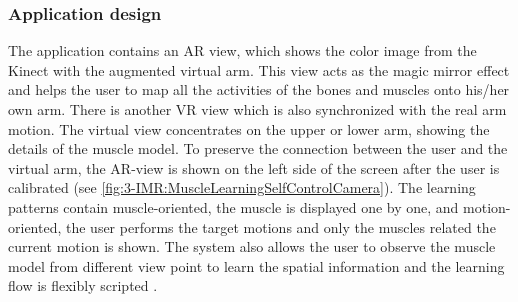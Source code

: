 \subsubsection{Application design}
The application contains an AR view, which shows the color image from the Kinect with the augmented virtual arm. This view acts as the magic mirror effect and helps the user to map all the activities of the bones and muscles onto his/her own arm. There is another VR view which is also synchronized with the real arm motion. The virtual view concentrates on the upper or lower arm, showing the details of the muscle model. To preserve the connection between the user and the virtual arm, the AR-view is shown on the left side of the screen after the user is calibrated (see \figurename{\ref{fig:3-IMR:MuscleLearningSelfControlCamera}}). 
The learning patterns contain muscle-oriented, the muscle is displayed one by one, and motion-oriented, the user performs the target motions and only the muscles related the current motion is shown. 
The system also allows the user to observe the muscle model from different view point to learn the spatial information and the learning flow is flexibly scripted \cite{Jutzi2015}. 

